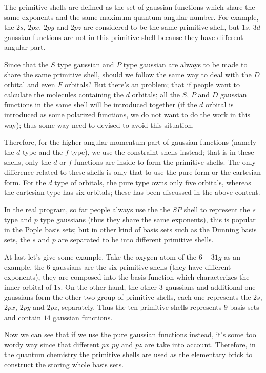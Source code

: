 The primitive shells are defined as the set of gaussian functions
which share the same exponents and the same maximum quantum angular
number. For example, the $2s$, $2px$, $2py$ and $2pz$ are considered
to be the same primitive shell, but $1s$, $3d$ gaussian functions are
not in this primitive shell because they have different angular part.

Since that the $S$ type gaussian and $P$ type gaussian are always to
be made to share the same primitive shell, should we follow the same
way to deal with the $D$ orbital and even $F$ orbitals? But there's an
problem; that if people want to calculate the molecules containing the
$d$ orbitals; all the $S$, $P$ and $D$ gaussian functions in the same
shell will be introduced together (if the $d$ orbital is introduced as
some polarized functions, we do not want to do the work in this way);
thus some way need to devised to avoid this situation.

Therefore, for the higher angular momentum part of gaussian functions
(namely the $d$ type and the $f$ type), we use the constraint shells
instead; that is in these shells, only the $d$ or $f$ functions are
inside to form the primitive shells. The only difference related to
these shells is only that to use the pure form or the cartesian
form. For the $d$ type of orbitals, the pure type owns only five
orbitals, whereas the cartesian type has six orbitals; these has been
discussed in the above content.

In the real program, so far people always use the the $SP$ shell to
represent the $s$ type and $p$ type gaussians (thus they share the
same exponents), this is popular in the Pople basis sets; but in other
kind of basis sets such as the Dunning basis sets, the $s$ and $p$ are
separated to be into different primitive shells.

At last let's give some example. Take the oxygen atom of the $6-31g$
as an example, the $6$ gaussians are the six primitive shells (they
have different exponents), they are composed into the basis function
which characterizes the inner orbital of $1s$. On the other hand, the
other $3$ gaussians and additional one gaussians form the other two
group of primitive shells, each one represents the $2s$, $2px$, $2py$
and $2pz$, separately. Thus the ten primitive shells represents $9$
basis sets and contain $14$ gaussian functions.

Now we can see that if we use the pure gaussian functions instead,
it's some too wordy way since that different $px$ $py$ and $pz$ are
take into account. Therefore, in the quantum chemistry the primitive
shells are used as the elementary brick to construct the storing whole
basis sets.

